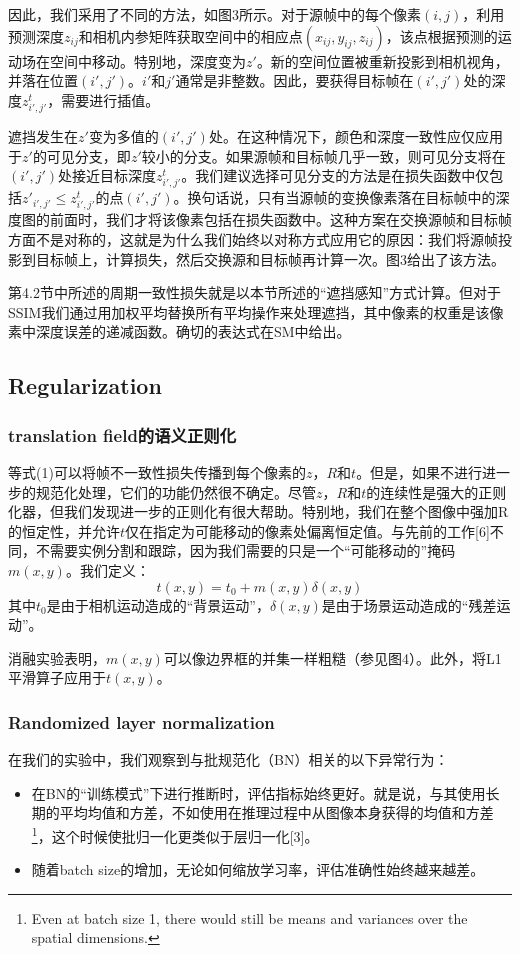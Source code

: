 \documentclass[10pt,journal,compsoc,UTF8]{IEEEtran}
\begin{document}
因此，我们采用了不同的方法，如图3所示。对于源帧中的每个像素$(i,j)$，利用预测深度$z_{ij}$和相机内参矩阵获取空间中的相应点$(x_{ij},y_{ij},z_{ij})$，该点根据预测的运动场在空间中移动。特别地，深度变为$z'$。新的空间位置被重新投影到相机视角，并落在位置$(i',j')$。$i'$和$j'$通常是非整数。因此，要获得目标帧在$(i',j')$处的深度$z^{t}_{i',j'}$，需要进行插值。

遮挡发生在$z'$变为多值的$(i',j')$处。在这种情况下，颜色和深度一致性应仅应用于$z'$的可见分支，即$z'$较小的分支。如果源帧和目标帧几乎一致，则可见分支将在$(i',j')$处接近目标深度$z^{t}_{i',j'}$。我们建议选择可见分支的方法是在损失函数中仅包括$z'_{i',j'}≤z^{t}_{i',j'}$的点$(i',j')$。换句话说，只有当源帧的变换像素落在目标帧中的深度图的前面时，我们才将该像素包括在损失函数中。这种方案在交换源帧和目标帧方面不是对称的，这就是为什么我们始终以对称方式应用它的原因：我们将源帧投影到目标帧上，计算损失，然后交换源和目标帧再计算一次。图3给出了该方法。

第4.2节中所述的周期一致性损失就是以本节所述的“遮挡感知”方式计算。但对于SSIM我们通过用加权平均替换所有平均操作来处理遮挡，其中像素的权重是该像素中深度误差的递减函数。确切的表达式在SM中给出。

\subsection{Regularization}
\subsubsection{translation field的语义正则化}
等式(1)可以将帧不一致性损失传播到每个像素的$z$，$R$和$t$。但是，如果不进行进一步的规范化处理，它们的功能仍然很不确定。尽管$z$，$R$和$t$的连续性是强大的正则化器，但我们发现进一步的正则化有很大帮助。特别地，我们在整个图像中强加R的恒定性，并允许$t$仅在指定为可能移动的像素处偏离恒定值。与先前的工作[6]不同，不需要实例分割和跟踪，因为我们需要的只是一个“可能移动的”掩码$m(x,y)$。我们定义：
\begin{equation}
  t(x,y)=t_0+m(x,y)\delta(x,y)
\end{equation}
其中$t_0$是由于相机运动造成的“背景运动”，$\delta(x,y)$是由于场景运动造成的“残差运动”。

消融实验表明，$m(x,y)$可以像边界框的并集一样粗糙（参见图4）。此外，将L1平滑算子应用于$t(x,y)$。
\subsubsection{Randomized layer normalization}
在我们的实验中，我们观察到与批规范化（BN）相关的以下异常行为：
\begin{itemize}
  \item 在BN的“训练模式”下进行推断时，评估指标始终更好。就是说，与其使用长期的平均均值和方差，不如使用在推理过程中从图像本身获得的均值和方差\footnote{Even at batch size 1, there would still be means and variances over the spatial dimensions.}，这个时候使批归一化更类似于层归一化[3]。
  \item 随着batch size的增加，无论如何缩放学习率，评估准确性始终越来越差。
\end{itemize}
\end{document}
